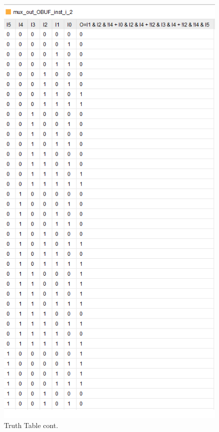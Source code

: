 \documentclass{article}
\begin{document}
\begin{figure}[h]
\begin{center}
\includegraphics[width=1\textwidth]{MultiplexerTruthTableCont.png} %
\caption{Truth Table cont.}
\end{center}
\end{figure}
\end{document}
